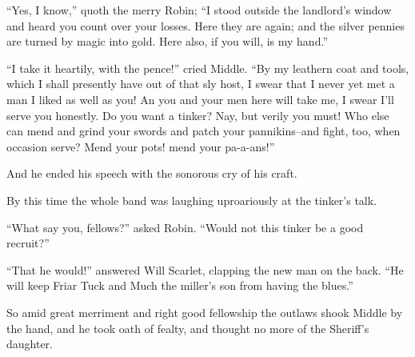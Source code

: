 ``Yes, I know,'' quoth the merry Robin; ``I stood outside the landlord's
window and heard you count over your losses. Here they are again; and
the silver pennies are turned by magic into gold. Here also, if you
will, is my hand.''

``I take it heartily, with the pence!'' cried Middle. ``By my leathern
coat and tools, which I shall presently have out of that sly host, I
swear that I never yet met a man I liked as well as you! An you and your
men here will take me, I swear I'll serve you honestly. Do you want a
tinker? Nay, but verily you must! Who else can mend and grind your
swords and patch your pannikins--and fight, too, when occasion serve?
Mend your pots! mend your pa-a-ans!''

And he ended his speech with the sonorous cry of his craft.

By this time the whole band was laughing uproariously at the tinker's
talk.

``What say you, fellows?'' asked Robin. ``Would not this tinker be a
good recruit?''

``That he would!'' answered Will Scarlet, clapping the new man on the
back. ``He will keep Friar Tuck and Much the miller's son from having
the blues.''

So amid great merriment and right good fellowship the outlaws shook
Middle by the hand, and he took oath of fealty, and thought no more of
the Sheriff's daughter.
